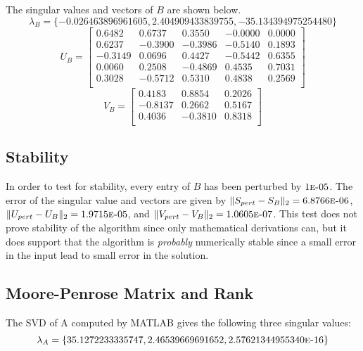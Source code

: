 \documentclass[letterpaper,12pt,]{article}
\begin{document}
The singular values and vectors of $B$ are shown below.
\begin{equation*}
\lambda_B = \{-0.026463896961605, 2.404909433839755, -35.134394975254480\}
\end{equation*}
\begin{equation*}
U_B = 
\begin{bmatrix}
    0.6482 &  0.6737 &  0.3550 & -0.0000 &  0.0000\\
    0.6237 & -0.3900 & -0.3986 & -0.5140 &  0.1893\\
   -0.3149 &  0.0696 &  0.4427 & -0.5442 &  0.6355\\
    0.0060 &  0.2508 & -0.4869 &  0.4535 &  0.7031\\
    0.3028 & -0.5712 &  0.5310 &  0.4838 &  0.2569\\
\end{bmatrix}
\end{equation*}
\begin{equation*}
V_B = 
\begin{bmatrix}
    0.4183 &  0.8854 &  0.2026\\
   -0.8137 &  0.2662 &  0.5167\\
    0.4036 & -0.3810 &  0.8318\\
\end{bmatrix}
\end{equation*}

\subsection*{Stability}
In order to test for stability, every entry of $B$ has been perturbed by $1\textsc{e-}05$. The error of the singular value and vectors are given by $\|S_{pert}-S_{B}\|_2=6.8766\textsc{e-}06$, $\|U_{pert}-U_{B}\|_2=1.9715\textsc{e-}05$, and $\|V_{pert}-V_{B}\|_2=1.0605\textsc{e-}07$. This test does not prove stability of the algorithm since only mathematical derivations can, but it does support that the algorithm is \emph{probably} numerically stable since a small error in the input lead to small error in the solution.

\subsection*{Moore-Penrose Matrix and Rank}

The SVD of A computed by MATLAB gives the following three singular values:
\begin{equation*}
\lambda_A = \{35.1272233335747, 2.46539669691652, 2.57621344955340\textsc{e-}16 \}
\end{equation*}
\end{document}
